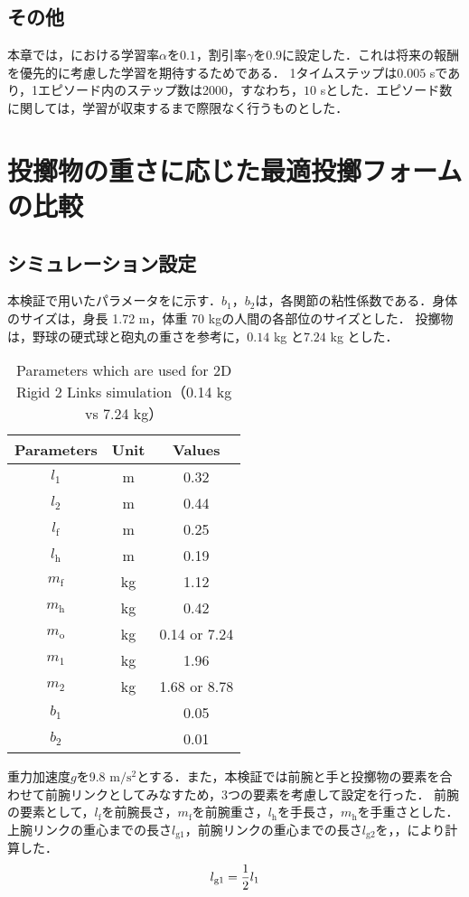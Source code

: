 \subsection{その他}
本章では，における学習率$\alpha$を$0.1$，割引率$\gamma$を$0.9$に設定した．これは将来の報酬を優先的に考慮した学習を期待するためである．
1タイムステップは$0.005$ sであり，1エピソード内のステップ数は2000，すなわち，$10$ sとした．エピソード数に関しては，学習が収束するまで際限なく行うものとした．
\section{投擲物の重さに応じた最適投擲フォームの比較}
\subsection{シミュレーション設定}
本検証で用いたパラメータをに示す\cite{irving}．$b_{1}$，$b_{2}$は，各関節の粘性係数である．身体のサイズは，身長 1.72 m，体重 70 kgの人間の各部位のサイズとした．
投擲物は，野球の硬式球と砲丸の重さを参考に，$0.14$ kg\cite{horiuchi} と$7.24$ kg\cite{haq} とした．
\begin{table}[tb]
  \begin{center}
    \caption{Parameters which are used for 2D Rigid 2 Links simulation（0.14 kg vs 7.24 kg）}
    \begin{tabular}{c|c|c}
      \hline
      Parameters & Unit & Values \\
      \hline
      $l_{1}$ & m & 0.32 \\
      $l_{2}$ & m & 0.44 \\
      $l_{\mathrm{f}}$ & m & 0.25 \\
      $l_{\mathrm{h}}$ & m & 0.19 \\
      $m_{\mathrm{f}}$ & kg & 1.12 \\
      $m_{\mathrm{h}}$ & kg & 0.42 \\
      $m_{\mathrm{o}}$ & kg & 0.14 or 7.24 \\
      $m_{1}$ & kg & 1.96 \\
      $m_{2}$ & kg & 1.68 or 8.78 \\
      $b_{1}$ &  & 0.05 \\
      $b_{2}$ &  & 0.01 \\
      \hline
    \end{tabular}
  \end{center}
\end{table}
重力加速度$g$を9.8 $\mathrm{m/s^{2}}$とする．また，本検証では前腕と手と投擲物の要素を合わせて前腕リンクとしてみなすため，3つの要素を考慮して設定を行った．
前腕の要素として，$l_{\mathrm{f}}$を前腕長さ，$m_{\mathrm{f}}$を前腕重さ，$l_{\mathrm{h}}$を手長さ，$m_{\mathrm{h}}$を手重さとした．\\
上腕リンクの重心までの長さ$l_{\mathrm{g1}}$，前腕リンクの重心までの長さ$l_{\mathrm{g2}}$を，，により計算した．
\begin{eqnarray}
  \equlabel{2.27}
  l_{\mathrm{g1}}=\frac{1}{2}l_{1}
\end{eqnarray}

